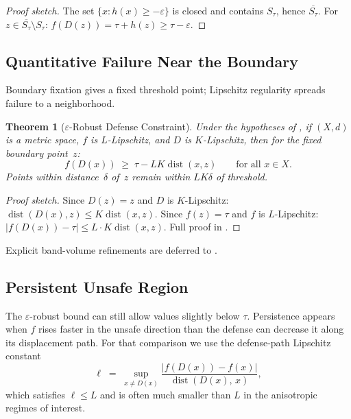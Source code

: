 \documentclass[11pt]{article}
\newtheorem{theorem}{Theorem}[section]
\newcommand{\cl}[1]{\overline{#1}}
\newcommand{\dist}{\operatorname{dist}}
\begin{document}
\begin{proof}[Proof sketch]
The set $\{x : h(x) \geq -\varepsilon\}$ is closed and contains
$S_\tau$, hence $\cl{S_\tau}$. For
$z \in \cl{S_\tau} \setminus S_\tau$:
$f(D(z)) = \tau + h(z) \geq \tau - \varepsilon$.
\end{proof}

\subsection{Quantitative Failure Near the Boundary}
\label{sec:eps-robust}

Boundary fixation gives a fixed threshold point; Lipschitz regularity
spreads failure to a neighborhood.

\begin{theorem}[$\varepsilon$-Robust Defense Constraint]
\label{thm:eps-robust}
Under the hypotheses of , if $(X,d)$ is a metric
space, $f$ is $L$-Lipschitz, and $D$ is $K$-Lipschitz, then for
the fixed boundary point~$z$:
\begin{equation}
  f(D(x)) \;\geq\; \tau - LK\dist(x, z)
  \qquad \text{for all } x \in X.
\end{equation}
Points within distance~$\delta$ of~$z$ remain within
$LK\delta$ of threshold.
\end{theorem}

\begin{proof}[Proof sketch]
Since $D(z)=z$ and $D$ is $K$-Lipschitz:
$\dist(D(x),z) \leq K\dist(x,z)$. Since $f(z)=\tau$ and $f$ is
$L$-Lipschitz:
$|f(D(x)) - \tau| \leq L \cdot K\dist(x,z)$.
Full proof in .
\end{proof}

Explicit band-volume refinements are deferred to .

\subsection{Persistent Unsafe Region}
\label{sec:persistent}

The $\varepsilon$-robust bound can still allow values slightly below
$\tau$. Persistence appears when $f$ rises faster in the unsafe
direction than the defense can decrease it along its displacement path.
For that comparison we use the defense-path Lipschitz constant
\[
  \ell \;=\; \sup_{x \neq D(x)}
    \frac{|f(D(x)) - f(x)|}{\dist(D(x),\, x)},
\]
which satisfies $\ell \le L$ and is often much smaller than $L$ in the
anisotropic regimes of interest.
\end{document}
